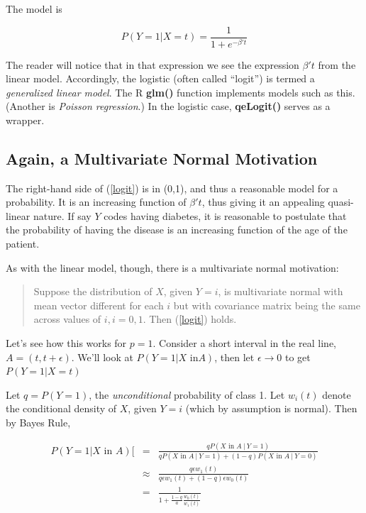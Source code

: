 The model is

\begin{equation}
\label{logit}
P(Y = 1 | X = t) =
\frac{1}{1 + e^{-\beta' t}}
\end{equation}

The reader will notice that in that expression we see the expression
$\beta't$ from the linear model.  Accordingly, the logistic (often
called ``logit'') is termed a \textit{generalized linear model}.
The R \textbf{glm()} function implements models such as this.  (Another
is \textit{Poisson regression}.)  In the logistic case,
\textbf{qeLogit()} serves as a wrapper.

\subsection{Again, a Multivariate Normal Motivation}

The right-hand side of (\ref{logit}) is in (0,1), and thus a reasonable
model for a probability.  It is an increasing function of $\beta't$,
thus giving it an appealing quasi-linear nature.  If say $Y$ codes
having diabetes, it is reasonable to postulate that the probability of
having the disease is an increasing function of the age of the patient.

As with the linear model, though, there is a multivariate normal
motivation:

\begin{quote}
Suppose the distribution of $X$, given $Y = i$, is multivariate normal
with mean vector different for each $i$ but with covariance matrix being
the same across values of $i, i = 0,1$.  Then (\ref{logit}) holds.
\end{quote}

Let's see how this works for $p = 1$.  Consider a short interval in the
real line, $A = (t,t+\epsilon)$.  We'll look at $P(Y = 1 | X \textrm{ in
} A)$, then let $\epsilon \rightarrow 0$ to get $P(Y = 1 | X = t)$

Let $q = P(Y = 1)$, the \textit{unconditional} probability of class 1.
Let $w_i(t)$ denote the conditional density of $X$, given $Y = i$ (which
by assumption is normal).  Then by Bayes Rule,

\begin{eqnarray}
P(Y = 1 | X \textrm{ in } A) [&=& 
\frac
{q P(X \textrm{ in } A ~|~  Y = 1)}
{
{q P(X \textrm{ in } A ~|~ Y = 1)} +
(1-q) P(X \textrm{ in } A ~|~ Y = 0) 
} \\
&\approx&  
\frac{q \epsilon w_1(t)}
{q \epsilon w_1(t) + (1-q) \epsilon w_0(t)} \\
&=& 
\label{logitform}
\frac{1}{1 + \frac{1-q}{a} \frac{w_0(t)}{w_1(t)}}
\end{eqnarray}

